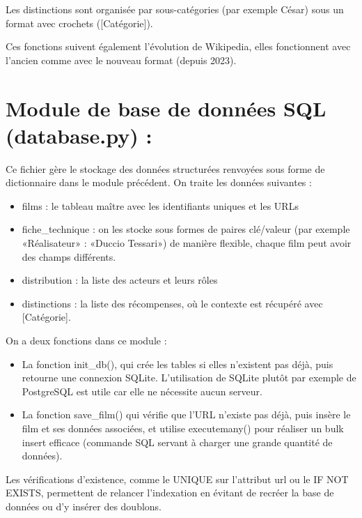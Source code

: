 \documentclass[11pt]{report}
\begin{document}
    Les distinctions sont organisée par sous-catégories (par exemple César) sous un format avec
    crochets ([Catégorie]).
 
    Ces fonctions suivent également l'évolution de Wikipedia, elles fonctionnent avec l'ancien comme
    avec le nouveau format (depuis 2023).
 
    \section{Module de base de données SQL (database.py) :}
 
    Ce fichier gère le stockage des données structurées renvoyées sous forme de dictionnaire dans le
    module précédent. On traite les données suivantes :
 
    \begin{itemize}
        \item films : le tableau maître avec les identifiants uniques et les URLs
        \item fiche\_technique : on les stocke sous formes de paires clé/valeur (par exemple
        «Réalisateur» : «Duccio Tessari») de manière flexible, chaque film peut avoir des champs
        différents.
        \item distribution : la liste des acteurs et leurs rôles
        \item distinctions : la liste des récompenses, où le contexte est récupéré avec [Catégorie].
    \end{itemize}
 
    On a deux fonctions dans ce module :
 
    \begin{itemize}
        \item La fonction init\_db(), qui crée les tables si elles n'existent pas déjà, puis retourne une
        connexion SQLite. L'utilisation de SQLite plutôt par exemple de PostgreSQL est utile car
        elle ne nécessite aucun serveur.
        \item La fonction save\_film() qui vérifie que l'URL n'existe pas déjà, puis insère le film et ses
        données associées, et utilise executemany() pour réaliser un bulk insert efficace (commande
        SQL servant à charger une grande quantité de données).
    \end{itemize}
 
    Les vérifications d'existence, comme le UNIQUE sur l'attribut url ou le IF NOT EXISTS,
    permettent de relancer l'indexation en évitant de recréer la base de données ou d'y insérer des
    doublons.
 
\end{document}
